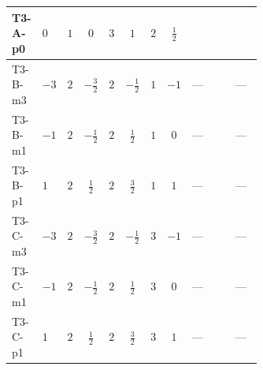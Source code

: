 \documentclass[8pt]{article}
\begin{document}
\begin{landscape}
\begin{longtable}{@{}llcccccc >{\raggedright\arraybackslash}p{0.21\linewidth} >{\raggedright\arraybackslash}p{0.21\linewidth} >{\raggedright\arraybackslash}p{0.21\linewidth}@{}}
\midrule
T3-A-p0 & $0$ & $1$ & $0$ & $3$ & $1$ & $2$ & $\frac{1}{2}$ & \scriptsize\adjustbox{max width=\linewidth}{$\begin{gathered} +\frac{3 {\lambda_{HS_2}^{(A)}}^2}{2}\end{gathered}$} & \scriptsize\adjustbox{max width=\linewidth}{$\begin{gathered} +14 {\lambda_{S_2}^{(1)}}^2\end{gathered}$} & \scriptsize\adjustbox{max width=\linewidth}{$\begin{gathered} +26 {\lambda_{S_2}^{(A)}}^2\end{gathered}$} \\
\midrule
T3-B-m3 & $-3$ & $2$ & $-\frac{3}{2}$ & $2$ & $-\frac{1}{2}$ & $1$ & $-1$ & --- & \scriptsize\adjustbox{max width=\linewidth}{$\begin{gathered} +12 {\lambda_{S_2}^{(1)}}^2\end{gathered}$} & --- \\
\midrule
T3-B-m1 & $-1$ & $2$ & $-\frac{1}{2}$ & $2$ & $\frac{1}{2}$ & $1$ & $0$ & --- & \scriptsize\adjustbox{max width=\linewidth}{$\begin{gathered} +12 {\lambda_{S_2}^{(1)}}^2\end{gathered}$} & --- \\
\midrule
T3-B-p1 & $1$ & $2$ & $\frac{1}{2}$ & $2$ & $\frac{3}{2}$ & $1$ & $1$ & --- & \scriptsize\adjustbox{max width=\linewidth}{$\begin{gathered} +12 {\lambda_{S_2}^{(1)}}^2\end{gathered}$} & --- \\
\midrule
T3-C-m3 & $-3$ & $2$ & $-\frac{3}{2}$ & $2$ & $-\frac{1}{2}$ & $3$ & $-1$ & --- & \scriptsize\adjustbox{max width=\linewidth}{$\begin{gathered} +12 {\lambda_{S_2}^{(1)}}^2\end{gathered}$} & --- \\
\midrule
T3-C-m1 & $-1$ & $2$ & $-\frac{1}{2}$ & $2$ & $\frac{1}{2}$ & $3$ & $0$ & --- & \scriptsize\adjustbox{max width=\linewidth}{$\begin{gathered} +12 {\lambda_{S_2}^{(1)}}^2\end{gathered}$} & --- \\
\midrule
T3-C-p1 & $1$ & $2$ & $\frac{1}{2}$ & $2$ & $\frac{3}{2}$ & $3$ & $1$ & --- & \scriptsize\adjustbox{max width=\linewidth}{$\begin{gathered} +12 {\lambda_{S_2}^{(1)}}^2\end{gathered}$} & --- \\

\end{longtable}
\end{landscape}
\end{document}
